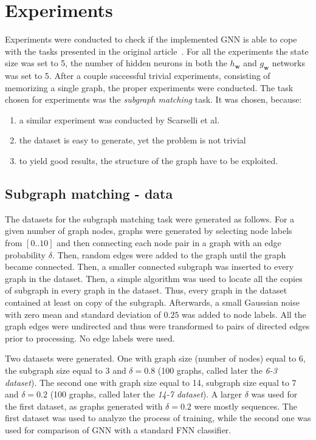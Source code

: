 
\chapter{Experiments~\label{ch:experiments}}
Experiments were conducted to check if the implemented GNN is able to cope with the tasks presented in the original article~\cite{scarselli2009graph}. For all the experiments the state size was set to 5, the number of hidden neurons in both the $h_{\bm{w}}$ and $g_{\bm{w}}$ networks was set to 5. After a couple successful trivial experiments, consisting of memorizing a single graph, the proper experiments were conducted. The task chosen for experiments was the \emph{subgraph matching} task. It was chosen, because:
\begin{enumerate}
	\item a similar experiment was conducted by Scarselli et al.~\cite{scarselli2009graph}
	\item the dataset is easy to generate, yet the problem is not trivial
	\item to yield good results, the structure of the graph have to be exploited.
\end{enumerate}

\section{Subgraph matching - data}
The datasets for the subgraph matching task were generated as follows. For a given number of graph nodes, graphs were generated by selecting node labels from $[0..10]$ and then connecting each node pair in a graph with an edge probability $\delta$. Then, random edges were added to the graph until the graph became connected. Then, a smaller connected subgraph was inserted to every graph in the dataset. Then, a simple algorithm was used to locate all the copies of subgraph in every graph in the dataset. Thus, every graph in the dataset contained at least on copy of the subgraph. Afterwards, a small Gaussian noise with zero mean and standard deviation of $0.25$ was added to node labels. All the graph edges were undirected and thus were transformed to pairs of directed edges prior to processing. No edge labels were used.

Two datasets were generated. One with graph size (number of nodes) equal to 6, the subgraph size equal to 3 and $\delta = 0.8$ (100 graphs, called later the \emph{6-3 dataset}). The second one with graph size equal to 14, subgraph size equal to 7 and $\delta = 0.2$ (100 graphs, called later the \emph{14-7 dataset}). A larger $\delta$ was used for the first dataset, as graphs generated with $\delta = 0.2$ were mostly sequences. The first dataset was used to analyze the process of training, while the second one was used for comparison of GNN with a standard FNN classifier.

